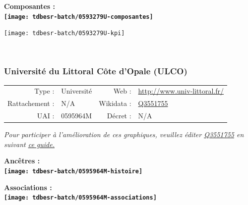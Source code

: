 \documentclass[12pt,french,]{article}
\begin{document}
\hrulefill

\begin{center} \bf Composantes : \\  
\texttt{[image: tdbesr-batch/0593279U-composantes]} \end{center}

\begin{center}\texttt{[image: tdbesr-batch/0593279U-kpi]} \end{center}\checkoddpage

\ifoddpage ~\newpage \fi   

\hypertarget{universituxe9-du-littoral-cuxf4te-dopale-ulco}{%
\subsubsection{Université du Littoral Côte d'Opale
(ULCO)}\label{universituxe9-du-littoral-cuxf4te-dopale-ulco}}

\begin{tabular*}{\textwidth}{rp{5cm}rl}  
\hline  
Type : & Université & Web : &\href{http://www.univ-littoral.fr/}{http://www.univ-littoral.fr/} \\  
Rattachement : & N/A & Wikidata : & \href{https://www.wikidata.org/entity/Q3551755}{Q3551755} \\  
UAI : & 0595964M & Décret : & N/A \\  
\hline  
\end{tabular*}

\textit{\scriptsize Pour participer à l'amélioration de ces graphiques, veuillez éditer  \href{https://www.wikidata.org/entity/Q3551755}{Q3551755}  en suivant \href{https://github.com/cpesr/wikidataESR/blob/master/Rmd/wikidataESR.md}{ce guide.}}

\vspace{1cm}  
\begin{minipage}[b]{0.50\textwidth}\begin{center} \bf Ancêtres : \\  
\texttt{[image: tdbesr-batch/0595964M-histoire]} \end{center}\end{minipage}\begin{minipage}[b]{0.50\textwidth}\begin{center} \bf Associations : \\  
\texttt{[image: tdbesr-batch/0595964M-associations]} \end{center}\end{minipage}
\end{document}
